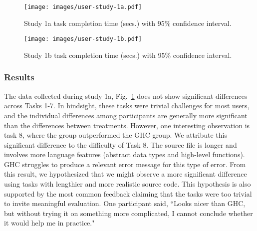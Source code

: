
\begin{figure}
    \centering
    \texttt{[image: images/user-study-1a.pdf]}
    \caption{Study 1a task completion time (secs.) with 95\% confidence interval.}
    \label{fig:analysis-1a}
\end{figure}


\begin{figure}
    \centering
    \texttt{[image: images/user-study-1b.pdf]}
    \caption{Study 1b task completion time (secs.) with 95\% confidence interval.}
    \label{fig:analysis-1b}
\end{figure}

\subsubsection*{\textbf {Results}}

The data collected during study 1a, Fig.~\ref{fig:analysis-1a} does not show significant differences across Tasks 1-7. In hindsight, these tasks were trivial challenges for most users, and the individual differences among participants are generally more significant than the differences between treatments. However, one interesting observation is task 8, where the \chameleon{} group outperformed the GHC group. We attribute this significant difference to the difficulty of Task 8. The source file is longer and involves more language features (abstract data types and high-level functions). GHC struggles to produce a relevant error message for this type of error. 
From this result, we hypothesized that we might observe a more significant difference using tasks with lengthier and more realistic source code. 
This hypothesis is also supported by the most common feedback claiming that the tasks were too trivial to invite meaningful evaluation. One participant said, ``Looks nicer than GHC, but without trying it on something more complicated, I cannot conclude whether it would help me in practice." 

